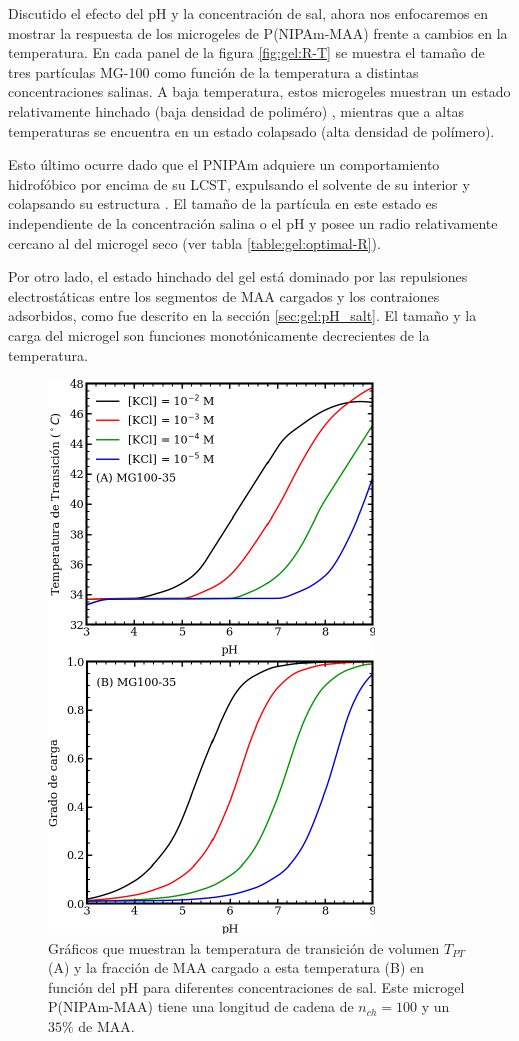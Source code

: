 Discutido el efecto del pH y la concentraci\'on de sal, ahora nos enfocaremos en mostrar la respuesta de los microgeles de P(NIPAm-MAA) frente a cambios en la temperatura.
En cada panel de la figura \ref{fig:gel:R-T} se muestra el tama\~no de tres part\'iculas MG-100 como funci\'on de la temperatura a distintas concentraciones salinas.
A baja temperatura, estos microgeles muestran un estado relativamente hinchado (baja densidad de polim\'ero) , mientras que a altas temperaturas se encuentra en un estado colapsado (alta densidad de pol\'imero).

Esto \'ultimo ocurre dado que el PNIPAm adquiere un comportamiento hidrof\'obico por encima de su LCST, expulsando el solvente de su interior y colapsando su estructura \cite{sbeih2019structural}.
El tama\~no de la part\'icula  en este estado es independiente de la concentraci\'on salina o el pH y posee un radio relativamente cercano al del microgel seco (ver tabla \ref{table:gel:optimal-R}).

Por otro lado, el estado hinchado del gel est\'a dominado por las repulsiones electrost\'aticas entre los segmentos de MAA cargados y los contraiones adsorbidos, como fue descrito en la secci\'on \ref{sec:gel:pH_salt}.
El tama\~no y la carga del microgel son funciones monot\'onicamente  decrecientes de la temperatura.


\begin{figure}[!htb]
	\centering
	\includegraphics[width=0.40\linewidth]{Figures/graph-gel/Tpt-pH.pdf}
	\caption{Gr\'aficos que muestran la temperatura de transici\'on de volumen $T_{PT}$ (A) y la fracci\'on de MAA cargado a esta temperatura (B) en funci\'on del pH para diferentes concentraciones de sal.
		Este microgel P(NIPAm-MAA) tiene una longitud de cadena de $n_{ch}=100$ y un $35\%$ de MAA.}
	\label{fig:gel:Tpt-pH}
\end{figure}


